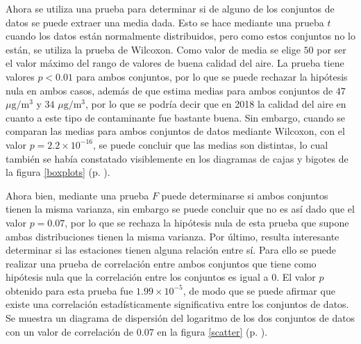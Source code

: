 \documentclass[paper=leter, fontsize=11pt]{scrartcl}
\numberwithin{equation}{section}		%
\numberwithin{figure}{section}			%
\numberwithin{table}{section}				%
\begin{document}
Ahora se utiliza una prueba para determinar si de alguno de los conjuntos de datos se puede extraer una media dada. Esto se hace mediante una prueba $t$ cuando los datos están normalmente distribuidos, pero como estos conjuntos no lo están, se utiliza la prueba de Wilcoxon. Como valor de media se elige $50$ por ser el valor máximo del rango de valores de buena calidad del aire. La prueba tiene valores $p < 0.01$ para ambos conjuntos, por lo que se puede rechazar la hipótesis nula en ambos casos, además de que estima medias para ambos conjuntos de $47$ $\mu\text{g}/\text{m}^3$ y $34$ $\mu\text{g}/\text{m}^3$, por lo que se podría decir que en 2018 la calidad del aire en cuanto a este tipo de contaminante fue bastante buena. Sin embargo, cuando se comparan las medias para ambos conjuntos de datos mediante Wilcoxon, con el valor $p = 2.2 \times 10 ^{-16}$, se puede concluir que las medias son distintas, lo cual también se había constatado visiblemente en los diagramas de cajas y bigotes de la figura \ref{boxplots} (p. \pageref{boxplots}).

Ahora bien, mediante una prueba $F$ puede determinarse si ambos conjuntos tienen la misma varianza, sin embargo se puede concluir que no es así dado que el valor $p = 0.07$, por lo que se rechaza la hipótesis nula de esta prueba que supone ambas distribuciones tienen la misma varianza. Por último, resulta interesante determinar si las estaciones tienen alguna relación entre sí. Para ello se puede realizar una prueba de correlación entre ambos conjuntos que tiene como hipótesis nula que la correlación entre los conjuntos es igual a $0$. El valor $p$ obtenido para esta prueba fue $1.99 \times 10 ^{-5}$, de modo que se puede afirmar que existe una correlación estadísticamente significativa entre los conjuntos de datos. Se muestra un diagrama de dispersión del logaritmo de los dos conjuntos de datos con un valor de correlación de $0.07$ en la figura \ref{scatter} (p. \pageref{scatter}).
\end{document}

